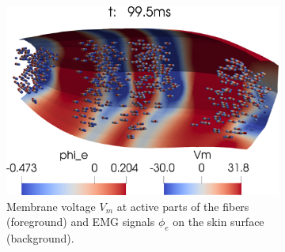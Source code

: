 \begin{figure}[H]
  \centering%
  \begin{subfigure}[t]{0.7\textwidth}%
    \centering%
    \includegraphics[width=\textwidth]{images/results/application/mu20a.png}%
    \caption{Membrane voltage $V_m$ at active parts of the fibers (foreground) and EMG signals $\phi_e$ on the skin surface (background).}%
    \label{fig:mu20a}%
  \end{subfigure} \,
  \begin{subfigure}[t]{0.25\textwidth}%
    \centering%

\end{subfigure}
\end{figure}
